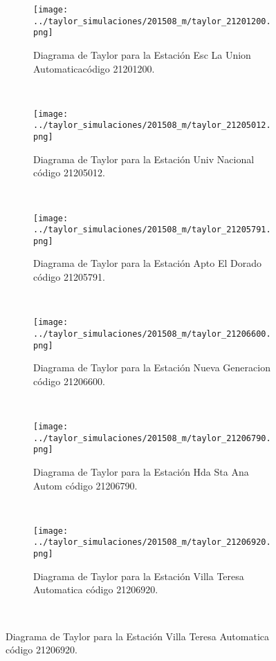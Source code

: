 \begin{figure}
\begin{subfigure}[normla]{0.5\textwidth}
\caption{Diagrama de Taylor para la Estación Esc La Union Automaticacódigo 21201200.}
\texttt{[image: ../taylor\_simulaciones/201508\_m/taylor\_21201200.png]}
\end{subfigure}
~
\begin{subfigure}[normla]{0.5\textwidth}
\caption{Diagrama de Taylor para la Estación Univ Nacional código 21205012.}
\texttt{[image: ../taylor\_simulaciones/201508\_m/taylor\_21205012.png]}
\end{subfigure}
~
\begin{subfigure}[normla]{0.5\textwidth}
\caption{Diagrama de Taylor para la Estación Apto El Dorado código 21205791.}
\texttt{[image: ../taylor\_simulaciones/201508\_m/taylor\_21205791.png]}
\end{subfigure}
~
\begin{subfigure}[normla]{0.5\textwidth}
\caption{Diagrama de Taylor para la Estación Nueva Generacion código 21206600.}
\texttt{[image: ../taylor\_simulaciones/201508\_m/taylor\_21206600.png]}
\end{subfigure}
~
\begin{subfigure}[normla]{0.5\textwidth}
\caption{Diagrama de Taylor para la Estación Hda Sta Ana Autom código 21206790.}
\texttt{[image: ../taylor\_simulaciones/201508\_m/taylor\_21206790.png]}
\end{subfigure}
~
\begin{subfigure}[normla]{0.5\textwidth}
\caption{Diagrama de Taylor para la Estación Villa Teresa Automatica código 21206920.}
\texttt{[image: ../taylor\_simulaciones/201508\_m/taylor\_21206920.png]}
\end{subfigure}
~
\end{figure}
           

